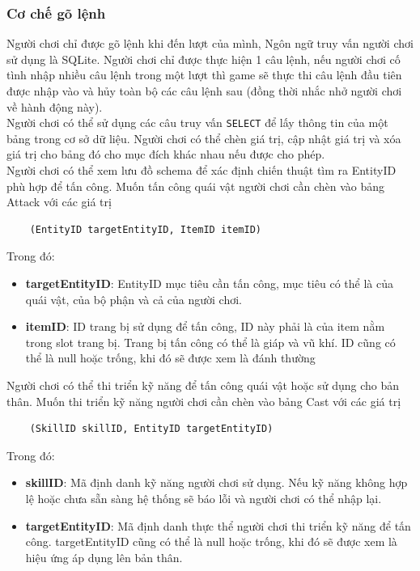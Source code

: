 \subsubsection{Cơ chế gõ lệnh}
\hspace*{0.5cm} Người chơi chỉ được gõ lệnh khi đến lượt của mình, Ngôn ngữ truy vấn người chơi sử dụng là SQLite. Người chơi chỉ được thực hiện 1 câu lệnh, nếu người chơi cố tình nhập nhiều câu lệnh trong một lượt thì game sẽ thực thi câu lệnh đầu tiên được nhập vào và hủy toàn bộ các câu lệnh sau (đồng thời nhắc nhở người chơi về hành động này).\\
\hspace*{0.5cm} Người chơi có thể sử dụng các câu truy vấn \texttt{SELECT} để lấy thông tin của một bảng trong cơ sở dữ liệu. Người chơi có thể chèn giá trị, cập nhật giá trị và xóa giá trị cho bảng đó cho mục đích khác nhau nếu được cho phép.\\
\hspace*{0.5cm} Người chơi có thể xem lưu đồ schema để xác định chiến thuật tìm ra EntityID phù hợp để tấn công. Muốn tấn công quái vật người chơi cần chèn vào bảng Attack với các giá trị 
\begin{verbatim}
	(EntityID targetEntityID, ItemID itemID)
\end{verbatim}
Trong đó:
\begin{itemize}
	\item \textbf{targetEntityID}: EntityID mục tiêu cần tấn công, mục tiêu có thể là của quái vật, của bộ phận và cả của người chơi.
	\item \textbf{itemID}: ID trang bị sử dụng để tấn công, ID này phải là của item nằm trong slot trang bị. Trang bị tấn công có thể là giáp và vũ khí. ID cũng có thể là null hoặc trống, khi đó sẽ được xem là đánh thường
\end{itemize}
\hspace*{0.5cm} Người chơi có thể thi triển kỹ năng để tấn công quái vật hoặc sử dụng cho bản thân. Muốn thi triển kỹ năng người chơi cần chèn vào bảng Cast với các giá trị 
\begin{verbatim}
	(SkillID skillID, EntityID targetEntityID)
\end{verbatim}
Trong đó:
\begin{itemize}
	\item \textbf{skillID}: Mã định danh kỹ năng người chơi sử dụng. Nếu kỹ năng không hợp lệ hoặc chưa sẵn sàng hệ thống sẽ báo lỗi và người chơi có thể nhập lại.
	\item \textbf{targetEntityID}: Mã định danh thực thể người chơi thi triển kỹ năng để tấn công. targetEntityID cũng có thể là null hoặc trống, khi đó sẽ được xem là hiệu ứng áp dụng lên bản thân.
\end{itemize}

